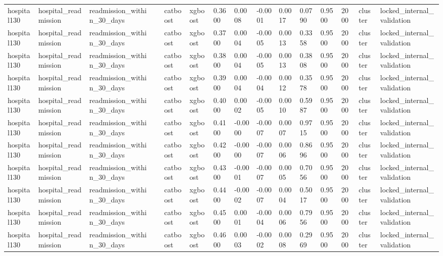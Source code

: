 \begin{tabular}{lllllllllllllll}
hospital130 & hospital\_readmission & readmission\_within\_30\_days &  & catboost & xgboost & 0.3600 & 0.0008 & -0.0001 & 0.0017 & 0.0790 & 0.9500 & 2000 & cluster & locked\_internal\_validation \\
hospital130 & hospital\_readmission & readmission\_within\_30\_days &  & catboost & xgboost & 0.3700 & 0.0004 & -0.0005 & 0.0013 & 0.3358 & 0.9500 & 2000 & cluster & locked\_internal\_validation \\
hospital130 & hospital\_readmission & readmission\_within\_30\_days &  & catboost & xgboost & 0.3800 & 0.0004 & -0.0005 & 0.0013 & 0.3808 & 0.9500 & 2000 & cluster & locked\_internal\_validation \\
hospital130 & hospital\_readmission & readmission\_within\_30\_days &  & catboost & xgboost & 0.3900 & 0.0004 & -0.0004 & 0.0012 & 0.3578 & 0.9500 & 2000 & cluster & locked\_internal\_validation \\
hospital130 & hospital\_readmission & readmission\_within\_30\_days &  & catboost & xgboost & 0.4000 & 0.0002 & -0.0005 & 0.0010 & 0.5987 & 0.9500 & 2000 & cluster & locked\_internal\_validation \\
hospital130 & hospital\_readmission & readmission\_within\_30\_days &  & catboost & xgboost & 0.4100 & -0.0000 & -0.0007 & 0.0007 & 0.9715 & 0.9500 & 2000 & cluster & locked\_internal\_validation \\
hospital130 & hospital\_readmission & readmission\_within\_30\_days &  & catboost & xgboost & 0.4200 & -0.0000 & -0.0007 & 0.0006 & 0.8696 & 0.9500 & 2000 & cluster & locked\_internal\_validation \\
hospital130 & hospital\_readmission & readmission\_within\_30\_days &  & catboost & xgboost & 0.4300 & -0.0001 & -0.0007 & 0.0005 & 0.7056 & 0.9500 & 2000 & cluster & locked\_internal\_validation \\
hospital130 & hospital\_readmission & readmission\_within\_30\_days &  & catboost & xgboost & 0.4400 & -0.0002 & -0.0007 & 0.0004 & 0.5017 & 0.9500 & 2000 & cluster & locked\_internal\_validation \\
hospital130 & hospital\_readmission & readmission\_within\_30\_days &  & catboost & xgboost & 0.4500 & 0.0001 & -0.0004 & 0.0006 & 0.7956 & 0.9500 & 2000 & cluster & locked\_internal\_validation \\
hospital130 & hospital\_readmission & readmission\_within\_30\_days &  & catboost & xgboost & 0.4600 & 0.0003 & -0.0002 & 0.0008 & 0.2969 & 0.9500 & 2000 & cluster & locked\_internal\_validation \\

\end{tabular}
